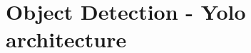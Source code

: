 \documentclass{standalone}
\begin{document}
\section[Yolo]{Object Detection - Yolo architecture}\label{obj_detection:yolo}

\end{document}
